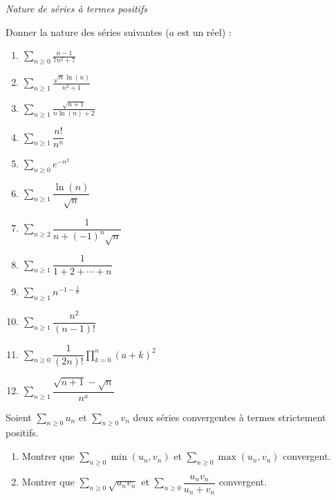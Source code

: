 \documentclass[a4paper,twoside,french,11pt]{VcCours}
\newcommand{\Sum}[2]{\ensuremath{\textstyle{\sum\limits_{#1}^{#2}}}}
\begin{document}

\tableofcontents
\separationTitre


\begin{center}
\textit{{ {\large Nature de séries à termes positifs}}}
\end{center}


\begin{Exercice} Donner la nature des séries suivantes ($a$ est un réel) :
\begin{multicols}{3}
\begin{enumerate}
\item $\Sum{n \geq 0}{} \frac{n-1}{7n^2+7}$
\item $\Sum{n \geq 1}{}\frac{\sqrt{n}\ln(n)}{n^2+1}$
\item $\Sum{n \geq 1}{}\frac{\sqrt{n+1}}{n\ln(n)+2}$ 
\item $\Sum{n \geq 1}{} \dfrac{n!}{n^n} $
\columnbreak
\item $\Sum{n \geq 0}{} e^{-n^2} $
\item $\Sum{n \geq 1}{} \dfrac{\ln(n)}{\sqrt{n}} $
\item $\Sum{n \geq 2}{} \dfrac{1}{n+(-1)^n \sqrt{n}} $
\item $\Sum{n \geq 1}{} \dfrac{1}{1+2+ \cdots + n} $
\columnbreak
\item $\Sum{n \geq 1}{} n^{-1- \frac{1}{n}} $
\item $\Sum{n \geq 1}{}  \dfrac{n^2}{(n-1)!} $
\item $\Sum{n \geq 0}{} \dfrac{1}{(2n)!} \prod_{k=0}^n (a+k)^2$ 
\item $\Sum{n \geq 1}{} \dfrac{\sqrt{n+1}-\sqrt{n}}{n^a}$ 
\end{enumerate}
\end{multicols}

\vspace{0.05cm}

\end{Exercice}


\begin{Exercice} Soient $\Sum{n \geq 0}{} u_n$ et $\Sum{n \geq 0}{} v_n$ deux séries convergentes à termes strictement positifs.
\begin{enumerate}
\item Montrer que $\Sum{n \geq 0}{} \min(u_n,v_n)$ et $\Sum{n \geq 0}{} \max(u_n,v_n)$ convergent.
\item Montrer que $\Sum{n \geq 0}{} \sqrt{u_n v_n}$ et $\Sum{n \geq 0}{} \dfrac{u_n v_n}{u_n+v_n}$ convergent.
\end{enumerate}
\end{Exercice}
\end{document}
